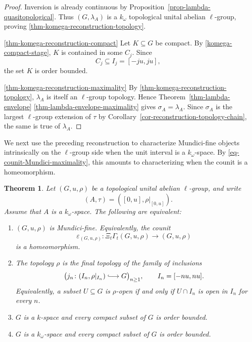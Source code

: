 \documentclass[preprint,3p]{elsarticle}
\theoremstyle{plain}
\newtheorem{thm}{Theorem}[section]
\theoremstyle{definition}
\newcommand{\longhookrightarrow}{\lhook\joinrel\longrightarrow}
\numberwithin{equation}{section}
\begin{document}
\begin{proof}
Inversion is already continuous by
Proposition~\ref{prop-lambda-quasitopological}.
Thus $(G,\lambda_A)$ is a $k_\omega$ topological unital abelian
$\ell$-group, proving \ref{thm-komega-reconstruction-topology}.

\ref{thm-komega-reconstruction-compact}
Let $K\subseteq G$ be compact.  By \ref{komega-compact-stage}, $K$ is
contained in some $C_j$.  Since
\[
 C_j\subseteq I_j=[-ju,ju],
\]
the set $K$ is order bounded.

\ref{thm-komega-reconstruction-maximality}
By \ref{thm-komega-reconstruction-topology}, $\lambda_A$ is itself an
$\ell$-group topology.  Hence
Theorem~\ref{thm-lambda-envelope}%
\ref{thm-lambda-envelope-maximality} gives
$\sigma_A=\lambda_A$.  Since $\sigma_A$ is the largest
$\ell$-group extension of $\tau$ by
Corollary~\ref{cor-reconstruction-topology-chain}, the same is true of
$\lambda_A$.
\end{proof}

We next use the preceding reconstruction to characterize
Mundici-fine objects intrinsically on the $\ell$-group side
when the unit interval is a $k_\omega$-space.
By \eqref{eq-counit-Mundici-maximality}, this amounts to
characterizing when the counit is a homeomorphism.

\begin{thm}
\label{thm-intrinsic-komega}
Let $(G,u,\rho)$ be a topological unital abelian $\ell$-group,
and write
\[
 (A,\tau)=([0,u],\rho|_{[0,u]}).
\]
Assume that $A$ is a $k_\omega$-space.  The following are equivalent:
\begin{enumerate}[label=(\roman*),ref=(\roman*)]
\item\label{thm-intrinsic-komega-counit}
$(G,u,\rho)$ is Mundici-fine.  Equivalently, the counit
\[
 \varepsilon_{(G,u,\rho)}\colon
 \Xi_t\Gamma_t(G,u,\rho)\longrightarrow(G,u,\rho)
\]
is a homeomorphism.
\item\label{thm-intrinsic-komega-final}
The topology $\rho$ is the final topology of the family
of inclusions
\[
 \bigl(j_n\colon(I_n,\rho|_{I_n})
 \longhookrightarrow G\bigr)_{n\geq1},
 \qquad I_n=[-nu,nu].
\]
Equivalently, a subset $U\subseteq G$ is $\rho$-open
if and only if $U\cap I_n$ is open in $I_n$ for every $n$.
\item\label{thm-intrinsic-komega-k-space}
$G$ is a $k$-space and every compact subset of $G$ is order bounded.
\item\label{thm-intrinsic-komega-komega}
$G$ is a $k_\omega$-space and every compact subset of $G$ is order
bounded.
\end{enumerate}
\end{thm}
\end{document}

